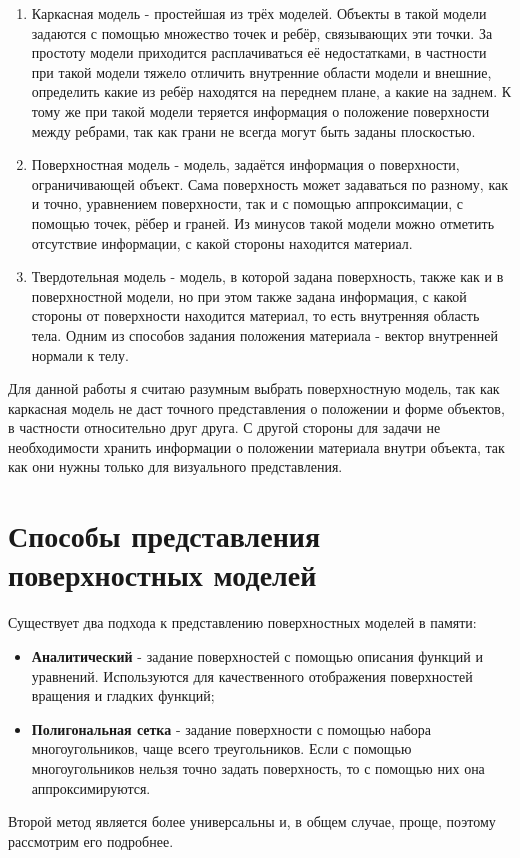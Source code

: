\begin{enumerate}
	\item Каркасная модель - простейшая из трёх моделей. Объекты в такой модели задаются с помощью множество точек и ребёр, связывающих эти точки. За простоту модели приходится расплачиваться её недостатками, в частности при такой модели тяжело отличить внутренние области модели и внешние, определить какие из ребёр находятся на переднем плане, а какие на заднем. К тому же при такой модели теряется информация о положение поверхности между ребрами, так как грани не всегда могут быть заданы плоскостью.
	\item Поверхностная модель - модель, задаётся информация о поверхности, ограничивающей объект. Сама поверхность может задаваться по разному, как и точно, уравнением поверхности, так и с помощью аппроксимации, с помощью точек, рёбер и граней. Из минусов такой модели можно отметить отсутствие информации, с какой стороны находится материал.
	\item Твердотельная модель - модель, в которой задана поверхность, также как и в поверхностной модели, но при этом также задана информация, с какой стороны от поверхности находится материал, то есть внутренняя область тела. Одним из способов задания положения материала - вектор внутренней нормали к телу.
\end{enumerate}

Для данной работы я считаю разумным выбрать поверхностную модель, так как каркасная модель не даст точного представления о положении и форме объектов, в частности относительно друг друга. С другой стороны для задачи не необходимости хранить информации о положении материала внутри объекта, так как они нужны только для визуального представления.

\section{Способы представления поверхностных моделей}
Существует два подхода к представлению поверхностных моделей в памяти:
\begin{itemize}
	\item \textbf{Аналитический} - задание поверхностей с помощью описания функций и уравнений. Используются для качественного отображения поверхностей вращения и гладких функций;
	\item \textbf{Полигональная сетка} - задание поверхности с помощью набора многоугольников, чаще всего треугольников. Если с помощью многоугольников нельзя точно задать поверхность, то с помощью них она аппроксимируются.
\end{itemize}
Второй метод является более универсальны и, в общем случае, проще, поэтому рассмотрим его подробнее.

